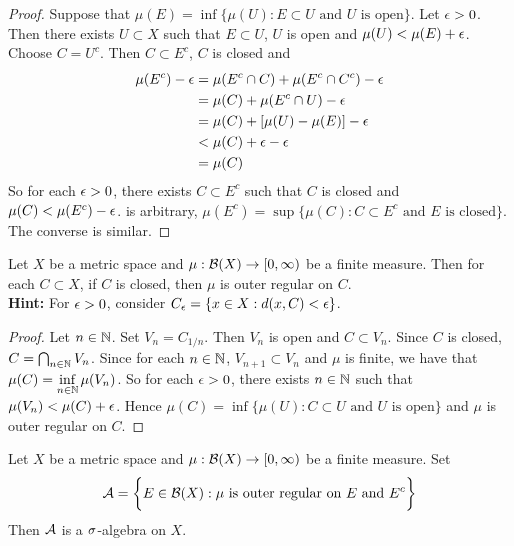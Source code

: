 \documentclass{book}
\begin{document}
	\begin{proof}
		Suppose that $\mu(E) = \inf  \{\mu(U): E \subset U \text{ and $U$ is open} \}$. Let $\epsilon >0$. Then there exists $U \subset X$ such that $E \subset U$, $U$ is open and $\mu(U) < \mu(E) + \epsilon$. Choose $C = U^c$. Then $C \subset E^c$, $C$ is closed and 
		\begin{align*}
			\mu(E^c) - \epsilon 
			&= \mu(E^c \cap C) + \mu(E^c \cap C^c) - \epsilon \\
			&= \mu(C) + \mu(E^c \cap U) - \epsilon \\
			&= \mu(C) + [\mu(U) - \mu(E)] - \epsilon \\
			&< \mu(C) + \epsilon - \epsilon \\
			&= \mu(C)
		\end{align*}
		So for each $\epsilon > 0$, there exists $C \subset E^c$ such that $C$ is closed and $\mu(C) < \mu(E^c) - \epsilon$. is arbitrary, $\mu(E^c) = \sup\{\mu(C): C \subset E^c \text{ and $E$ is closed}\}$. \\
		The converse is similar. 
	\end{proof}

	\begin{ex}
		Let $X$ be a metric space and $\mu: \mathcal{B}(X) \rightarrow [0,\infty)$ be a finite measure. Then for each $C \subset X$, if $C$ is closed, then $\mu$ is outer regular on $C$. \\
		\textbf{Hint:} For $\epsilon >0$, consider $C_{\epsilon} = \{x \in X: d(x, C) < \epsilon\}$. 
	\end{ex}

	\begin{proof}
		Let $n \in \mathbb{N}$. Set $V_n = C_{1/n}$. Then $V_n$ is open and $C \subset V_n$. Since $C$ is closed, $C = \bigcap_{n \in \mathbb{N}} V_n$. Since for each $n \in \mathbb{N}$, $V_{n+1} \subset V_n$ and $\mu$ is finite, we have that $\mu(C) = \inf\limits_{n \in \mathbb{N}} \mu(V_n)$. So for each $\epsilon >0$, there exists $n \in \mathbb{N}$ such that $\mu(V_n) < \mu(C) + \epsilon$. Hence $\mu(C) = \inf \{\mu(U): C \subset U \text{ and $U$ is open} \}$ and $\mu$ is outer regular on $C$.    
	\end{proof}
	
	\begin{ex}
		Let $X$ be a metric space and $\mu: \mathcal{B}(X) \rightarrow [0,\infty)$ be a finite measure. Set 
		$$\mathcal{A} = \bigg \{E \in \mathcal{B}(X): \text{$\mu$ is outer regular on $E$ and $E^c$} \bigg\}$$  
		Then $\mathcal{A}$ is a $\sigma$-algebra on $X$.
	\end{ex}	
\end{document}
